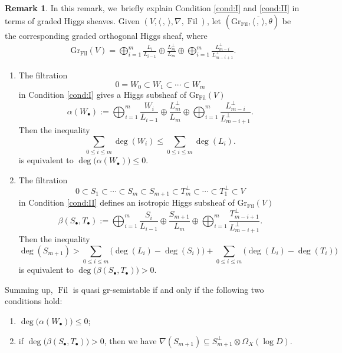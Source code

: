 \documentclass[JEP,XML,SOM,Unicode,published]{cedram}
\newcommand{\sbullet}{{\scriptscriptstyle\bullet}}
\newcommand{\grsemistable}{gr\nobreakdash-semi\-stable\xspace}
\DeclareMathOperator{\Filt}{Fil}
\newcommand{\Gr}{\mathrm{Gr}}
\theoremstyle{plain}
\theoremstyle{definition}
\newtheorem{rem}[thm]{Remark}
\begin{document}
\begin{rem}\label{explainregular}
In this remark, we~briefly explain Condition \eqref{cond:I} and \eqref{cond:II} in terms of graded Higgs sheaves. Given $(V, \langle \,, \, \rangle, \nabla, \Filt)$, let $(\Gr_{\Filt}, \overline{\langle \,, \, \rangle}, \theta)$ be the corresponding graded orthogonal Higgs sheaf, where
\begin{align*}
\Gr_{\Filt}(V)=\mathop{\bigoplus}_{i=1}^{m} \frac{L_i}{L_{i-1}}\oplus \frac{L_m^\perp}{L_m}\oplus \mathop{\bigoplus}_{i=1}^{m} \frac{L_{m-i}^\perp}{L_{m-i+1}^\perp}.
\end{align*}

\begin{enumerate}
\item The filtration
\[
0=W_0\subset W_1 \subset \cdots\subset W_m
\]
in Condition \eqref{cond:I} gives a Higgs subsheaf of $\Gr_{\Filt}(V)$
\[
\alpha(W_\sbullet):=\mathop{\bigoplus}_{i=1}^{m} \frac{W_i}{L_{i-1}}\oplus \frac{L_m^\perp}{L_m}\oplus \mathop{\bigoplus}_{i=1}^{m} \frac{L_{m-i}^\perp}{L_{m-i+1}^\perp}.
\]
Then the inequality
\[
\sum_{0\leq i\leq m}\deg(W_i)\leqslant\sum_{0\leq i\leq m}\deg(L_i).
\]
is equivalent to $\deg\big(\alpha(W_\sbullet)\big)\leq 0$. 
\item The filtration
\[
0\subset S_1 \subset \cdots\subset S_m\subset S_{m+1}\subset T_m^\perp\subset\cdots \subset T_1^\perp\subset V
\]
in Condition \eqref{cond:II} defines an isotropic Higgs subsheaf of $\Gr_{\Filt}(V)$
\[
\beta(S_\sbullet,T_\sbullet):=\mathop{\bigoplus}_{i=1}^{m} \frac{S_i}{L_{i-1}}\oplus \frac{S_{m+1}}{L_m}\oplus \mathop{\bigoplus}_{i=1}^{m} \frac{T_{m-i+1}^\perp}{L_{m-i+1}^\perp}.
\]
Then the inequality
\[
\deg(S_{m+1})>\sum_{0\leq i\leq m}\big(\deg(L_i)-\deg(S_i)\big)+\sum_{0\leq i\leq m}\big(\deg(L_i)-\deg(T_i)\big)
\]
is equivalent to $\deg\big(\beta(S_\sbullet,T_\sbullet)\big)>0$.
\end{enumerate}

Summing up, $\Filt$ is quasi \grsemistable if and only if the following two conditions hold:
\begin{enumerate}
\item $\deg\big(\alpha(W_\sbullet)\big)\leq 0$;

\item if $\deg\big(\beta(S_\sbullet,T_\sbullet)\big)>0$, then we have $\nabla(S_{m+1})\subseteq S_{m+1}^\perp \otimes\Omega_X(\log D)$.
\end{enumerate}
\end{rem}
\end{document}
